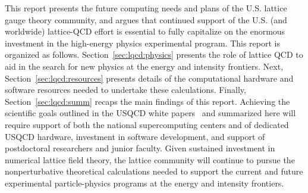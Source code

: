 This report presents the future computing needs and plans of the U.S. lattice gauge theory community, and argues that continued support of the U.S. (and worldwide) lattice-QCD effort is essential to fully capitalize on the enormous investment in the high-energy physics experimental program.  This report is organized as follows.  Section~\ref{sec:lqcd:physics} presents the role of lattice QCD to aid in the search for new physics at the energy and intensity frontiers.  Next, Section~\ref{sec:lqcd:resources} presents details of the computational hardware and software resources needed to undertake
these calculations.   Finally, Section~\ref{sec:lqcd:summ} recaps the main findings of this report.   Achieving the scientific goals outlined in the USQCD white papers~\cite{USQCD_EF_whitepaper13,USQCD_IF_whitepaper13} and summarized here will require support of both the national supercomputing centers and of dedicated USQCD hardware, investment in software development, and support of postdoctoral researchers and junior faculty.  Given sustained investment in numerical lattice field theory, the lattice community will continue to pursue the nonperturbative theoretical calculations needed to support the current and future experimental particle-physics programs at the energy and intensity frontiers.


